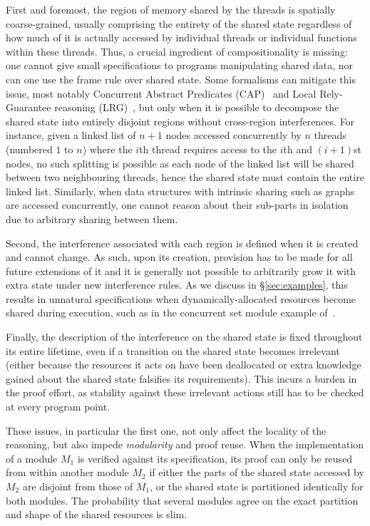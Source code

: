First and foremost, the region of memory shared by the threads is
spatially coarse-grained, usually comprising the entirety of the
shared state regardless of how much of it is actually accessed by
individual threads or individual functions within these threads. Thus,
a crucial ingredient of compositionality is missing: one cannot give
small specifications to programs manipulating shared data, nor can one
use the frame rule over shared state. Some formalisms can mitigate
this issue, most notably Concurrent Abstract Predicates
(CAP)~\cite{cap-ecoop10} and Local Rely-Guarantee reasoning
(LRG)~\cite{lrg}, but only when it is possible to decompose the shared
state into entirely disjoint regions without cross-region
interferences. For instance, given a linked list of $n+1$ nodes
accessed concurrently by $n$ threads (numbered $1$ to $n$) where
the $i$th thread requires access to the $i$th and $(i+1)$st nodes, no such splitting is possible as each node of the
linked list will be shared between two neighbouring threads, hence the
shared state must contain the entire linked list. Similarly, when data
structures with intrinsic sharing such as graphs are accessed
concurrently, one cannot reason about their sub-parts in isolation due
to arbitrary sharing between them.

Second, the interference associated with each region is defined when
it is created and cannot change. As such, upon its creation, provision
has to be made for all future extensions of it and it is generally not
possible to arbitrarily grow it with extra state under new
interference rules.  As we discuss in \S\ref{sec:examples}, this
results in unnatural specifications when dynamically-allocated
resources become shared during execution, such as in the concurrent
set module example of~\cite{cap-ecoop10}.

Finally, the description of the interference on the shared state is
fixed throughout its entire lifetime, even if a transition on the shared state 
becomes irrelevant (either because the resources it acts on have been
deallocated or extra knowledge gained about the shared state
falsifies its requirements). This incurs
a burden in the proof effort, as stability against these irrelevant
actions still has to be checked at every program point.

These issues, in particular the first one, not only affect the
locality of the reasoning, but also impede \emph{modularity} and proof
reuse. When the implementation of a module $M_1$ is verified against
its specification, its proof can only be reused from within another
module $M_2$ if either the parts of the shared state accessed by $M_2$
are disjoint from those of $M_1$, or the shared state is partitioned
identically for both modules. The probability that several modules
agree on the exact partition and shape of the shared resources is slim.

